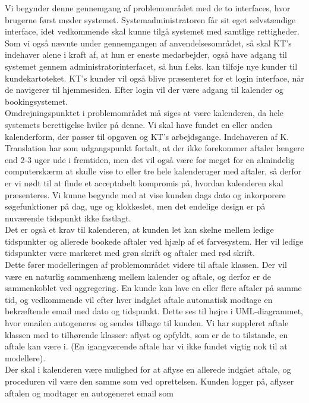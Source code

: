 \documentclass[12pt]{article}   %
\begin{document}
Vi begynder denne gennemgang af problemområdet med de to interfaces, hvor
brugerne først møder systemet. Systemadministratoren får sit eget selvstændige
interface, idet vedkommende skal kunne tilgå systemet med samtlige
rettigheder. Som vi også nævnte under gennemgangen af anvendelsesområdet, så
skal KT's indehaver alene i kraft af, at hun er eneste medarbejder, også have
adgang til systemet gennem administratorinterfacet, så hun f.eks. kan
tilføje nye kunder til kundekartoteket. KT's kunder vil også blive præsenteret
for et login interface, når de navigerer til hjemmesiden. Efter login vil der 
være adgang til kalender og bookingsystemet. \\
Omdrejningspunktet i problemområdet må siges at være kalenderen, da hele
systemets berettigelse hviler på denne. Vi skal have fundet en eller anden
kalenderform, der passer til opgaven og KT's arbejdsgange. Indehaveren af K.
Translation har som udgangspunkt fortalt, at der ikke forekommer aftaler længere
end 2-3 uger ude i fremtiden, men det vil også være for meget for en
almindelig computerskærm at skulle vise to eller tre hele kalenderuger med
aftaler, så derfor er vi nødt til at finde et acceptabelt kompromis på,
hvordan kalenderen skal præsenteres. Vi kunne begynde med at vise kunden dags 
dato og inkorporere søgefunktioner på dag, uge og klokkeslet, men det endelige
design er på nuværende tidspunkt ikke fastlagt.\\
Det er også et krav til kalenderen, at kunden let kan skelne mellem ledige
tidspunkter og allerede bookede aftaler ved hjælp af et farvesystem. Her vil
ledige tidspunkter være markeret med grøn skrift og aftaler med rød skrift. \\
Dette fører modelleringen af problemområdet videre til aftale klassen. Der vil 
være en naturlig sammenhæng mellem kalender og aftale, og derfor er de
sammenkoblet ved aggregering. En kunde kan lave en eller flere aftaler på
samme tid, og vedkommende vil efter hver indgået aftale automatisk modtage en 
bekræftende email med dato og tidspunkt. Dette ses til højre i UML-diagrammet,
hvor emailen autogeneres og sendes tilbage til kunden. Vi har suppleret aftale
klassen med to tilhørende klasser: aflyst og opfyldt, som er de to tilstande,
en aftale kan være i. (En igangværende aftale har vi ikke fundet vigtig nok
til at modellere).\\
Der skal i kalenderen være mulighed for at aflyse en
allerede indgået aftale, og proceduren vil være den samme som ved oprettelsen.
Kunden logger på, aflyser aftalen og modtager en autogeneret email som
\end{document}
